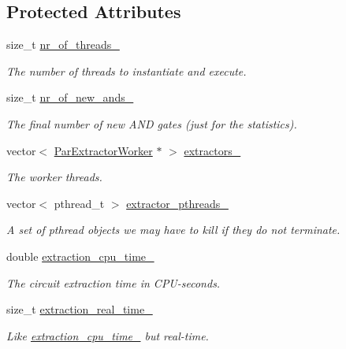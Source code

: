 \subsection*{Protected Attributes}
\begin{DoxyCompactItemize}
\item 
size\-\_\-t \hyperlink{classParExtractor_af95f31bb7e0c7c6f8063dfb23736c8e9}{nr\-\_\-of\-\_\-threads\-\_\-}
\begin{DoxyCompactList}\small\item\em The number of threads to instantiate and execute. \end{DoxyCompactList}\item 
size\-\_\-t \hyperlink{classParExtractor_acc46c480f31bd444d15c3f68b2392868}{nr\-\_\-of\-\_\-new\-\_\-ands\-\_\-}
\begin{DoxyCompactList}\small\item\em The final number of new A\-N\-D gates (just for the statistics). \end{DoxyCompactList}\item 
vector$<$ \hyperlink{classParExtractorWorker}{Par\-Extractor\-Worker} $\ast$ $>$ \hyperlink{classParExtractor_a16fc72f87a16e8dfbda55fcde4c7483e}{extractors\-\_\-}
\begin{DoxyCompactList}\small\item\em The worker threads. \end{DoxyCompactList}\item 
vector$<$ pthread\-\_\-t $>$ \hyperlink{classParExtractor_ad6e211ed74c4f35ff4dd1813779e77d3}{extractor\-\_\-pthreads\-\_\-}
\begin{DoxyCompactList}\small\item\em A set of pthread objects we may have to kill if they do not terminate. \end{DoxyCompactList}\item 
double \hyperlink{classCNFImplExtractor_ab8be06d42fd3c4b569ec22cfcf2f508e}{extraction\-\_\-cpu\-\_\-time\-\_\-}
\begin{DoxyCompactList}\small\item\em The circuit extraction time in C\-P\-U-\/seconds. \end{DoxyCompactList}\item 
size\-\_\-t \hyperlink{classCNFImplExtractor_ae06413cf08f868357d64545b3041aa18}{extraction\-\_\-real\-\_\-time\-\_\-}
\begin{DoxyCompactList}\small\item\em Like \hyperlink{classCNFImplExtractor_ab8be06d42fd3c4b569ec22cfcf2f508e}{extraction\-\_\-cpu\-\_\-time\-\_\-} but real-\/time. \end{DoxyCompactList}\end{DoxyCompactItemize}

